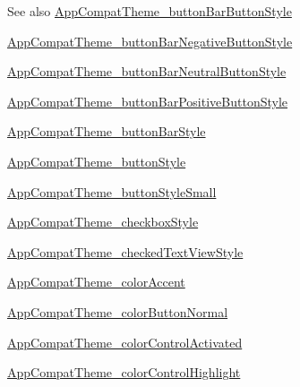 \begin{DoxySeeAlso}{See also}
\hyperlink{classandroid_1_1support_1_1v7_1_1mediarouter_1_1R_1_1styleable_ad20f3db7aa5369c7dcfc5bd51371b85a}{App\+Compat\+Theme\+\_\+button\+Bar\+Button\+Style} 

\hyperlink{classandroid_1_1support_1_1v7_1_1mediarouter_1_1R_1_1styleable_a5149daf27bddf85d912f992f8fa8acd1}{App\+Compat\+Theme\+\_\+button\+Bar\+Negative\+Button\+Style} 

\hyperlink{classandroid_1_1support_1_1v7_1_1mediarouter_1_1R_1_1styleable_aff182cdd74b6dce4c8c16447cb6760e6}{App\+Compat\+Theme\+\_\+button\+Bar\+Neutral\+Button\+Style} 

\hyperlink{classandroid_1_1support_1_1v7_1_1mediarouter_1_1R_1_1styleable_a43d9a32374dba702819c4ec6c05ab691}{App\+Compat\+Theme\+\_\+button\+Bar\+Positive\+Button\+Style} 

\hyperlink{classandroid_1_1support_1_1v7_1_1mediarouter_1_1R_1_1styleable_af5a3bc9fc8ba28ff915f6087ef908076}{App\+Compat\+Theme\+\_\+button\+Bar\+Style} 

\hyperlink{classandroid_1_1support_1_1v7_1_1mediarouter_1_1R_1_1styleable_ad16bbba5da5476638832d9e2a54b7abe}{App\+Compat\+Theme\+\_\+button\+Style} 

\hyperlink{classandroid_1_1support_1_1v7_1_1mediarouter_1_1R_1_1styleable_aec6eece48285252661fdccd6314fc69a}{App\+Compat\+Theme\+\_\+button\+Style\+Small} 

\hyperlink{classandroid_1_1support_1_1v7_1_1mediarouter_1_1R_1_1styleable_a2149fa776964dfd41a14357ea2f3c8c5}{App\+Compat\+Theme\+\_\+checkbox\+Style} 

\hyperlink{classandroid_1_1support_1_1v7_1_1mediarouter_1_1R_1_1styleable_a3664100d2a81d9957c8aea792d6b8c56}{App\+Compat\+Theme\+\_\+checked\+Text\+View\+Style} 

\hyperlink{classandroid_1_1support_1_1v7_1_1mediarouter_1_1R_1_1styleable_a8579a8f66a19549046fe28ca6a0b001b}{App\+Compat\+Theme\+\_\+color\+Accent} 

\hyperlink{classandroid_1_1support_1_1v7_1_1mediarouter_1_1R_1_1styleable_a2e67b376287180b911f79e22da40a678}{App\+Compat\+Theme\+\_\+color\+Button\+Normal} 

\hyperlink{classandroid_1_1support_1_1v7_1_1mediarouter_1_1R_1_1styleable_a4af1f042778d9a39c7755e8d349bfbe2}{App\+Compat\+Theme\+\_\+color\+Control\+Activated} 

\hyperlink{classandroid_1_1support_1_1v7_1_1mediarouter_1_1R_1_1styleable_a3101d4c220b1624630e177adbcb5bed1}{App\+Compat\+Theme\+\_\+color\+Control\+Highlight} 


\end{DoxySeeAlso}
